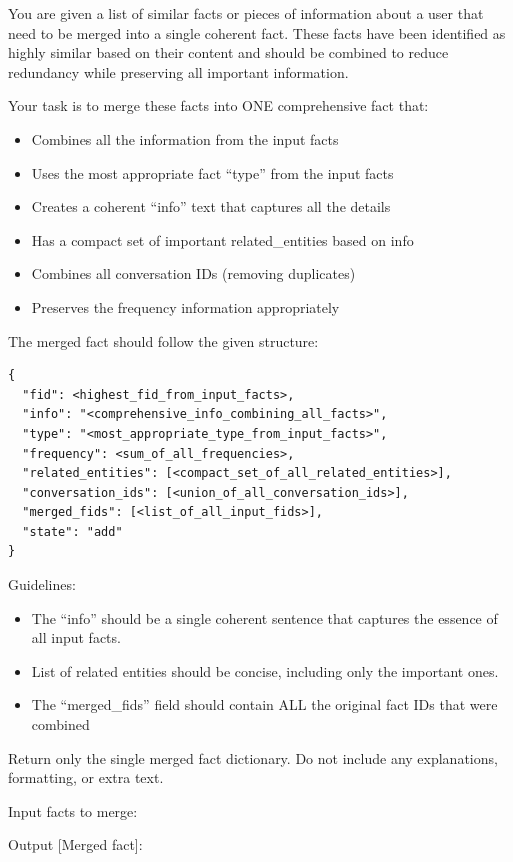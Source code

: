 \begin{promptbox}
You are given a list of similar facts or pieces of information about a user that need to be merged into a single coherent fact.  
These facts have been identified as highly similar based on their content and should be combined to reduce redundancy while preserving all important information.

Your task is to merge these facts into ONE comprehensive fact that:
\begin{itemize}
  \item Combines all the information from the input facts
  \item Uses the most appropriate fact ``type'' from the input facts
  \item Creates a coherent ``info'' text that captures all the details
  \item Has a compact set of important related\_entities based on info
  \item Combines all conversation IDs (removing duplicates)
  \item Preserves the frequency information appropriately
\end{itemize}

The merged fact should follow the given structure:
\begin{verbatim}
{
  "fid": <highest_fid_from_input_facts>,
  "info": "<comprehensive_info_combining_all_facts>",
  "type": "<most_appropriate_type_from_input_facts>",
  "frequency": <sum_of_all_frequencies>,
  "related_entities": [<compact_set_of_all_related_entities>],
  "conversation_ids": [<union_of_all_conversation_ids>],
  "merged_fids": [<list_of_all_input_fids>],
  "state": "add"
}
\end{verbatim}

Guidelines:
\begin{itemize}
  \item The ``info'' should be a single coherent sentence that captures the essence of all input facts.
  \item List of related entities should be concise, including only the important ones.
  \item The ``merged\_fids'' field should contain ALL the original fact IDs that were combined
\end{itemize}

Return only the single merged fact dictionary. Do not include any explanations, formatting, or extra text.

Input facts to merge: 

Output [Merged fact]:
\end{promptbox}



